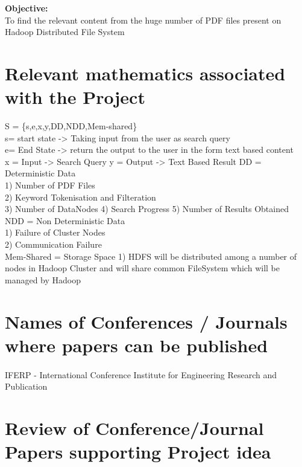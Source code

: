\documentclass[oneside,a4paper,12pt]{report}
\begin{document}
\noindent \textbf{Objective:} \\
To find the relevant content from the huge number of PDF files present on Hadoop Distributed File System \\



\section{Relevant mathematics associated with the Project}
\noindent
S = \{s,e,x,y,DD,NDD,Mem-shared\} \\
s= start state -> Taking input from the user as search query\\ e= End State -> return the output to the user in the form text based content \\
x = Input -> Search Query 
y = Output -> Text Based Result 
DD = Deterministic Data \\
1) Number of PDF Files \\
2) Keyword Tokenisation and Filteration \\
3) Number of DataNodes 4) Search Progress 
5) Number of Results Obtained 
NDD = Non Deterministic Data \\
1) Failure of Cluster Nodes \\
2) Communication Failure  \\
Mem-Shared = Storage Space 
1) HDFS will be distributed among a number of nodes in Hadoop Cluster and will share common FileSystem which will be managed by Hadoop \\


\section{Names of Conferences / Journals where papers can be published}
\paragraph{}
IFERP - International Conference Institute for Engineering Research and Publication  

\section{Review of Conference/Journal Papers supporting Project idea}
\paragraph{}
\end{document}
